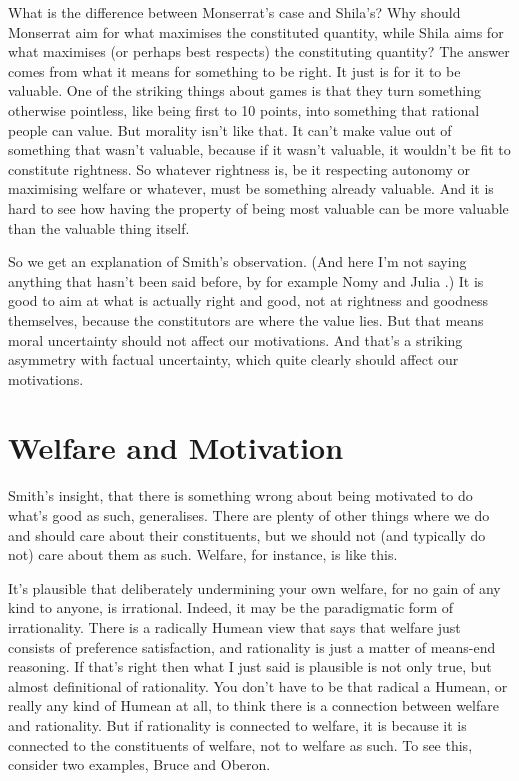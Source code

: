 What is the difference between \gls{Monserrat}'s case and \gls{Shila}'s? Why should \gls{Monserrat} aim for what maximises the constituted quantity, while \gls{Shila} aims for what maximises (or perhaps best respects) the constituting quantity? The answer comes from what it means for something to be right. It just is for it to be valuable. One of the striking things about games is that they turn something otherwise pointless, like being first to 10 points, into something that rational people can value. But morality isn't like that. It can't make value out of something that wasn't valuable, because if it wasn't valuable, it wouldn't be fit to constitute rightness. So whatever rightness is, be it respecting autonomy or maximising welfare or whatever, must be something already valuable. And it is hard to see how having the property of being most valuable can be more valuable than the valuable thing itself.

So we get an explanation of Smith's observation. (And here I'm not saying anything that hasn't been said before, by for example Nomy \citet{Arpaly2003} and Julia \citet{Markovits2010}.) It is good to aim at what is actually right and good, not at rightness and goodness themselves, because the constitutors are where the value lies. But that means moral uncertainty should not affect our motivations. And that's a striking asymmetry with factual uncertainty, which quite clearly should affect our motivations.

\section{Welfare and Motivation}
\label{welfareandmotivation}

Smith's insight, that there is something wrong about being motivated to do what's good as such, generalises. There are plenty of other things where we do and should care about their constituents, but we should not (and typically do not) care about them as such. Welfare, for instance, is like this.

It's plausible that deliberately undermining your own welfare, for no gain of any kind to anyone, is irrational. Indeed, it may be the paradigmatic form of irrationality. There is a radically Humean view that says that welfare just consists of preference satisfaction, and rationality is just a matter of means-end reasoning. If that's right then what I just said is plausible is not only true, but almost definitional of rationality. You don't have to be that radical a Humean, or really any kind of Humean at all, to think there is a connection between welfare and rationality. But if rationality is connected to welfare, it is because it is connected to the constituents of welfare, not to welfare as such. To see this, consider two examples, \gls{Bruce} and \gls{Oberon}.


